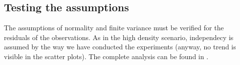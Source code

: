 \subsection{Testing the assumptions}\label{subsec:rectassumptions}

The assumptions of normality and finite variance must be verified for the
residuals of the observations. As in the high density scenario, independecy is
assumed by the way we have conducted the experiments (anyway, no trend is
visible in the scatter plots). The complete analysis can be found in
.



